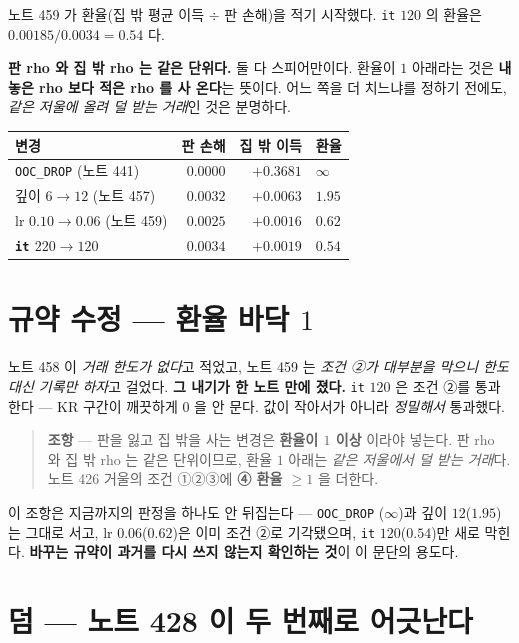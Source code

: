 \documentclass[11pt]{article}
\begin{document}
노트 459 가 환율(집 밖 평균 이득 $\div$ 판 손해)을 적기 시작했다.
\texttt{it} $120$ 의 환율은 $0.00185 / 0.0034 = \mathbf{0.54}$ 다.

\textbf{판 rho 와 집 밖 rho 는 같은 단위다.} 둘 다 스피어만이다. 환율이
$1$ 아래라는 것은 \textbf{내놓은 rho 보다 적은 rho 를 사 온다}는 뜻이다.
어느 쪽을 더 치느냐를 정하기 전에도, \emph{같은 저울에 올려 덜 받는
거래}인 것은 분명하다.

\begin{center}
\begin{tabular}{lrrl}
\hline
변경 & 판 손해 & 집 밖 이득 & 환율 \\
\hline
\texttt{OOC\_DROP} (노트 441) & $0.0000$ & $+0.3681$ & $\infty$ \\
깊이 $6 \to 12$ (노트 457) & $0.0032$ & $+0.0063$ & $1.95$ \\
lr $0.10 \to 0.06$ (노트 459) & $0.0025$ & $+0.0016$ & $0.62$ \\
\textbf{\texttt{it} $220 \to 120$} & $0.0034$ & $+0.0019$ & $\mathbf{0.54}$ \\
\hline
\end{tabular}
\end{center}

\section*{규약 수정 --- 환율 바닥 $1$}

노트 458 이 \emph{거래 한도가 없다}고 적었고, 노트 459 는 \emph{조건 ②가
대부분을 막으니 한도 대신 기록만 하자}고 걸었다. \textbf{그 내기가 한
노트 만에 졌다.} \texttt{it} $120$ 은 조건 ②를 통과한다 --- KR 구간이
깨끗하게 $0$ 을 안 문다. 값이 작아서가 아니라 \emph{정밀해서} 통과했다.

\begin{quote}
\textbf{조항} --- 판을 잃고 집 밖을 사는 변경은 \textbf{환율이 $1$ 이상}
이라야 넣는다. 판 rho 와 집 밖 rho 는 같은 단위이므로, 환율 $1$ 아래는
\emph{같은 저울에서 덜 받는 거래}다. 노트 426 거울의 조건 ①②③에
\textbf{④ 환율 $\ge 1$} 을 더한다.
\end{quote}

이 조항은 지금까지의 판정을 하나도 안 뒤집는다 --- \texttt{OOC\_DROP}
($\infty$)과 깊이 $12$($1.95$)는 그대로 서고, lr $0.06$($0.62$)은 이미
조건 ②로 기각됐으며, \texttt{it} $120$($0.54$)만 새로 막힌다.
\textbf{바꾸는 규약이 과거를 다시 쓰지 않는지 확인하는 것}이 이 문단의
용도다.

\section{덤 --- 노트 428 이 두 번째로 어긋난다}
\end{document}
